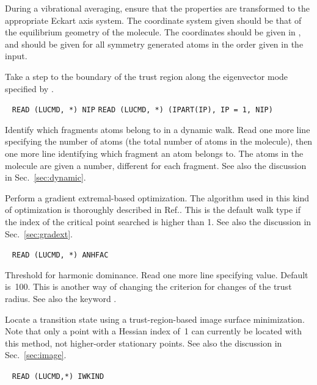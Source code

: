 \begin{description}
During a vibrational averaging, ensure that the properties are
transformed to the appropriate Eckart axis system.  The coordinate
system given should be that of the equilibrium geometry of the
molecule. The coordinates should be given in \bohr{}, and should be given
for all symmetry generated atoms in the order given in the input.

\item[\Key{EIGEN}] Take a step to the boundary of the trust
region
along the eigenvector mode specified by .

\item[\Key{FRAGME}]\verb| |\newline
\verb|READ (LUCMD, *) NIP|\newline
\verb|READ (LUCMD, *) (IPART(IP), IP = 1, NIP)|

Identify which fragments atoms belong to in
a dynamic walk.  Read one more line specifying the number of
atoms (the total number of atoms in the molecule), then one more
line identifying which fragment an atom belongs to. The atoms in the
molecule are given a number, different for each fragment. See also the
discussion in Sec.~\ref{sec:dynamic}.

\item[\Key{GRDEXT}] Perform a gradient extremal-based optimization. The algorithm used in this kind of optimization is
thoroughly described in Ref.\cite{pjhjajthtca73}. This is the default walk
type if the  index of the critical point searched is higher than
1. See also the discussion in Sec.~\ref{sec:gradext}.

\item[\Key{HARMON}]\verb| |\newline
\verb|READ (LUCMD, *) ANHFAC|

Threshold for harmonic dominance.  Read one
more line specifying value. Default is~100. This is  another
way of changing the criterion for changes of the trust
radius. See also the keyword .

\item[\Key{IMAGE}] Locate a transition state using a
trust-region-based image surface minimization.
Note that only a
point with a Hessian index of~1 can currently be located with this
method, not higher-order stationary points. See also the discussion in
Sec.~\ref{sec:image}.

\item[\Key{INDEX}]\verb| |\newline
\verb|READ (LUCMD,*) IWKIND|


\end{description}
